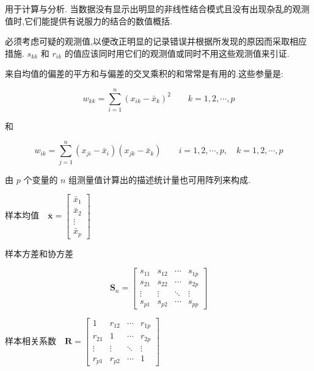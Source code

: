 
用于计算与分析. 当数据没有显示出明显的非线性结合模式且没有出现杂乱的观测值时,它们能提供有说服力的结合的数值概括.

必须考虑可疑的观测值,以便改正明显的记录错误并根据所发现的原因而采取相应措施. $s_{kk}$ 和 $r_{ik}$ 的值应该同时用它们的观测值或同时不用这些观测值来引证.

来自均值的偏差的平方和与偏差的交叉乘积的和常常是有用的.这些参量是:

\label{eq:1-6}
\begin{equation}
w_{kk} = \sum_{i=1}^{n}(x_{ik}-\bar{x}_k)^2 \qquad k=1,2,\cdots,p \tag{1-6}
\end{equation}

和

\label{eq:1-7}
\begin{equation}
w_{ik} = \sum_{j=1}^{n}(x_{ji}-\bar{x}_i)(x_{jk}-\bar{x}_k) \qquad i=1,2,\cdots,p, \quad k=1,2,\cdots,p \tag{1-7}
\end{equation}

由 $p$ 个变量的 $n$ 组测量值计算出的描述统计量也可用阵列来构成.

\begin{center}
\end{center}

样本均值\ \ $\bar{\bm{x}} = \begin{bmatrix}\bar{x}_1\\ \bar{x}_2\\ \vdots\\ \bar{x}_p\end{bmatrix}$

样本方差和协方差

\label{eq:1-8}
\begin{equation}
\bm{S}_n = \begin{bmatrix} s_{11} & s_{12} & \cdots & s_{1p}\\ s_{21} & s_{22} & \cdots & s_{2p}\\ \vdots & \vdots & \ddots & \vdots\\ s_{p1} & s_{p2} & \cdots & s_{pp}\end{bmatrix} \tag{1-8}
\end{equation}

样本相关系数\ \ $\bm{R} = \begin{bmatrix} 1 & r_{12} & \cdots & r_{1p}\\ r_{21} & 1 & \cdots & r_{2p}\\ \vdots & \vdots & \ddots & \vdots\\ r_{p1} & r_{p2} & \cdots & 1\end{bmatrix}$


